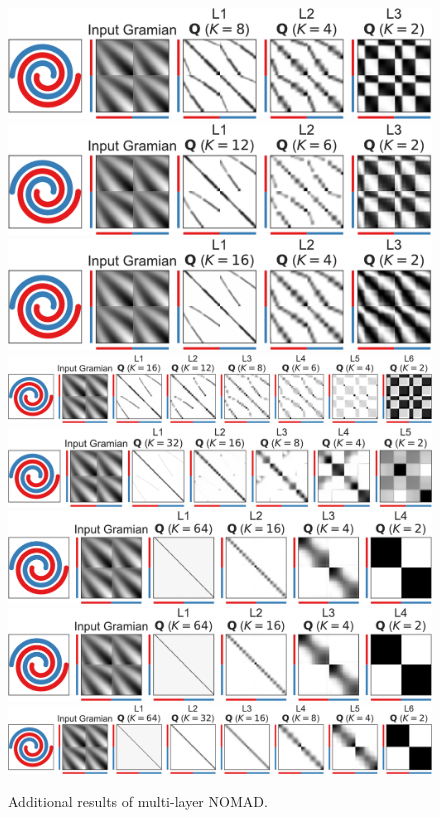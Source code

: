 \documentclass[twoside,11pt]{article}
\begin{document}
\begin{figure}
	\includegraphics[width=.618\linewidth]{multilayer/double_swiss_roll-8-4-2}%
	\\[2pt]
	\includegraphics[width=.618\linewidth]{multilayer/double_swiss_roll-12-6-2}%
	\\[2pt]
	\includegraphics[width=.618\linewidth]{multilayer/double_swiss_roll-16-4-2}%
	\\[2pt]
	\includegraphics[width=\linewidth]{multilayer/double_swiss_roll-16-12-8-6-4-2}%
	\\[2pt]
	\includegraphics[width=.873\linewidth]{multilayer/double_swiss_roll-32-16-8-4-2}%
	\\[2pt]
	\includegraphics[width=.744\linewidth]{multilayer/double_swiss_roll-64-16-4-2}%
	\\[2pt]
	\includegraphics[width=.744\linewidth]{multilayer/double_swiss_roll-64-16-4-2}%
	\\[2pt]
	\includegraphics[width=\linewidth]{multilayer/double_swiss_roll-64-32-16-8-4-2}%
	
	\caption{Additional results of multi-layer NOMAD.}
	\label{fig:additional_multilayer_double_swiss_roll}
\end{figure}
\end{document}
